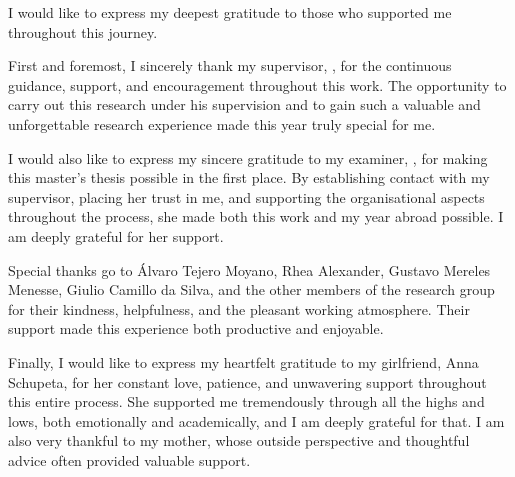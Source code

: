 
\begin{acknowledgements}
	\addchaptertocentry{\acknowledgementname}
	I would like to express my deepest gratitude to those who supported me
	throughout this journey.

	First and foremost, I sincerely thank my supervisor, \supname, for the
	continuous guidance, support, and encouragement
	throughout this work.
	The opportunity to carry out this research under his supervision and to
	gain such a valuable and unforgettable research experience made this year
	truly special for me.

	I would also like to express my sincere gratitude to my examiner,
	\examname, for making this master's thesis possible in the first place.
	By establishing contact with my supervisor, placing her trust in me, and
	supporting the organisational aspects throughout the process, she made both
	this work and my year abroad possible.
	I am deeply grateful for her support.

	Special thanks go to \'Alvaro Tejero Moyano, Rhea Alexander, Gustavo
	Mereles Menesse, Giulio Camillo da Silva, and the other members of the
	research group for their kindness, helpfulness, and the pleasant working
	atmosphere.
	Their support made this experience both productive and enjoyable.

	Finally, I would like to express my heartfelt gratitude to my girlfriend,
	Anna Schupeta, for her constant love, patience, and unwavering support throughout
	this entire process.
	She supported me tremendously through all the highs and lows, both
	emotionally and academically, and I am deeply grateful for that.
	I am also very thankful to my mother, whose outside perspective and
	thoughtful advice often provided valuable support.

\end{acknowledgements}


\tableofcontents %


